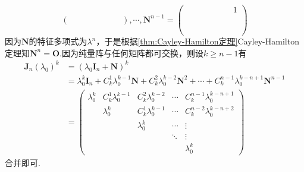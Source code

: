 {\begin{solution}
\[\begin{pmatrix}
                 &  &   &   &        &   &     \\
                 &  &   &   &        &   &   &
            \end{pmatrix},\cdots,\bm{N}^{n-1}=\begin{pmatrix}
                 &  &  &  &  &  &  & 1 \\
                \\
                \\
                \\
                \\
                \\
            \end{pmatrix}
        \]因为$\bm{N}$的特征多项式为$\lambda^n$，于是根据\cref{thm:Cayley-Hamilton定理}Cayley-Hamilton定理知$\bm{N}^n=\bm{O}.$因为纯量阵与任何矩阵都可交换，则设$k\geqslant n-1$有\begin{align*}
            \bm{J}_n\left(\lambda_0\right)^k & =\left(\lambda_0\bm{I}_n+\bm{N}\right)^k                                                                                   \\
                                             & =\lambda_0^k\bm{I}_n+C_k^1\lambda_0^{k-1}\bm{N}+C_k^2\lambda_0^{k-2}\bm{N}^2+\cdots+C_k^{n-1}\lambda_0^{k-n+1}\bm{N}^{n-1} \\
                                             & =\begin{pmatrix}
                                                    \lambda_0^k & C_k^1\lambda_0^{k-1} & C_k^2\lambda_0^{k-2} & \cdots & C_k^{n-1}\lambda_0^{k-n+1} \\
                                                                & \lambda_0^k          & C_k^1\lambda_0^{k-1} & \cdots & C_k^{n-2}\lambda_0^{k-n+2} \\
                                                                &                      & \lambda_0^k          & \cdots & \vdots                     \\
                                                                &                      &                      & \ddots & \vdots                     \\
                                                                &                      &                      &        & \lambda_0^k
                                                \end{pmatrix}
        \end{align*}合并即可.
    \end{solution}
}

